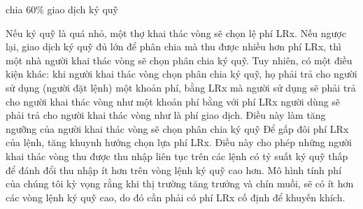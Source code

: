 \documentclass[12pt,a4paper]{article}
\makeatletter
\newenvironment{figurehere}
 {\def\@captype{figure}}
 {}
\makeatother
\begin{document}
\begin{multicols}{2}
\begin{center}
\begin{figurehere}
\caption{chia 60\% giao dịch ký quỹ}
\label{fig:marginsplit}
\end{figurehere}
\end{center}

Nếu ký quỹ là quá nhỏ, một thợ khai thác vòng sẽ chọn lệ phí LRx. Nếu ngược lại, giao dịch ký quỹ đủ lớn để phân chia mà thu được nhiều hơn  phí LRx, thì một nhà người khai thác vòng sẽ chọn phân chia ký quỹ. Tuy nhiên, có một điều kiện khác: khi người khai thác vòng chọn phân chia ký quỹ, họ phải trả cho người sử dụng (người đặt lệnh) một khoản phí, bằng LRx mà người sử dụng sẽ phải trả cho người khai thác vòng như một khoản phí bằng với phí LRx người dùng sẽ phải trả cho người khai thác vòng như là phí giao dịch. Điều này làm tăng ngưỡng của người khai thác vòng sẽ chọn phân chia ký quỹ
Để gấp đôi phí LRx của lệnh, tăng khuynh hướng chọn lựa phí LRx. Điều này cho phép những người khai thác vòng thu được thu nhập liên tục trên các lệnh có tỷ suất ký quỹ thấp để đánh đổi thu nhập ít hơn trên vòng lệnh ký quỹ cao hơn. Mô hình tính phí của chúng tôi kỳ vọng rằng khi thị trường tăng trưởng và chín muồi, sẽ có ít hơn các vòng lệnh ký quỹ cao, do đó cần phải có phí LRx cố định để khuyến khích.


\end{multicols}
\end{document}
